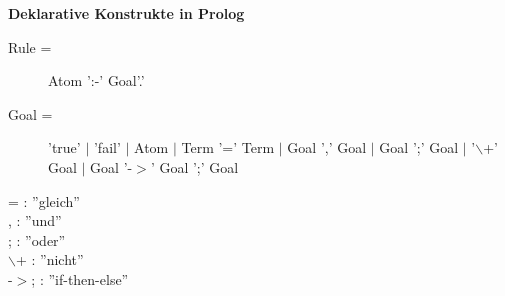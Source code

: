 \documentclass[11pt, a4paper,twocolumn]{scrartcl}
\begin{document}
{\bf Deklarative Konstrukte in Prolog}\\
\begin{description}
 \item[Rule =] Atom ':-' Goal'.'
 \item[Goal =] 'true' $|$ 'fail' $|$ Atom $|$ Term '=' Term $|$ Goal ',' Goal $|$ Goal ';' Goal $|$ '$\backslash$+' Goal $|$ Goal '-$>$' Goal ';' Goal
\end{description}

= : ''gleich''\\
, : ''und''\\
; : ''oder''\\
$\backslash$+ : ''nicht''\\
-$>$; : ''if-then-else''\\
\end{document}
